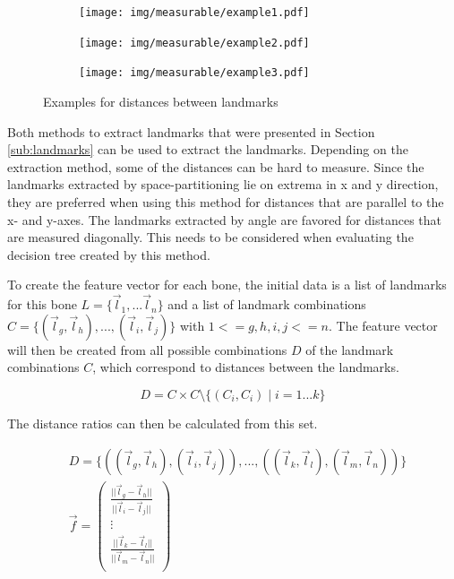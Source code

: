 \documentclass[pdftex,12pt,a4paper]{report}
\begin{document}
\begin{figure}[h]
	\centering
	\begin{subfigure}[b]{0.25\textwidth}
		\centering
		\texttt{[image: img/measurable/example1.pdf]}
	\end{subfigure}
	\begin{subfigure}[b]{0.25\textwidth}
		\centering
		\texttt{[image: img/measurable/example2.pdf]}
	\end{subfigure}
	\begin{subfigure}[b]{0.25\textwidth}
		\centering
		\texttt{[image: img/measurable/example3.pdf]}
	\end{subfigure}
	\caption{Examples for distances between landmarks}
	\label{fig:measurable-distances}
\end{figure}

Both methods to extract landmarks that were presented in Section \ref{sub:landmarks} can be used to extract the landmarks. Depending on the extraction method, some of the distances can be hard to measure. Since the landmarks extracted by space-partitioning lie on extrema in x and y direction, they are preferred when using this method for distances that are parallel to the x- and y-axes. The landmarks extracted by angle are favored for distances that are measured diagonally. This needs to be considered when evaluating the decision tree created by this method.

To create the feature vector for each bone, the initial data is a list of landmarks for this bone $L = \{ \vec{l}_1, ... \vec{l}_n \}$ and a list of landmark combinations $C = \{ (\vec{l}_g, \vec{l}_h), ..., (\vec{l}_i, \vec{l}_j) \}$ with $1 <= g,h,i,j <= n$. The feature vector will then be created from all possible combinations $D$ of the landmark combinations $C$, which correspond to distances between the landmarks.

\begin{equation}
D = C \times C \setminus \{ (C_i, C_i) \mid i = 1 ... k \}
\end{equation}

The distance ratios can then be calculated from this set.

\begin{equation}
\begin{split}
& D = \{ ((\vec{l}_g, \vec{l}_h), (\vec{l}_i, \vec{l}_j)), ..., ((\vec{l}_k, \vec{l}_l), (\vec{l}_m, \vec{l}_n)) \} \\
& \vec{f} = \left( \begin{array}{c}
\frac{||\vec{l}_g - \vec{l}_h||}{||\vec{l}_i - \vec{l}_j||} \\
\vdots \\
\frac{||\vec{l}_k - \vec{l}_l||}{||\vec{l}_m - \vec{l}_n||} \\
\end{array} \right)
\end{split}
\end{equation}
\end{document}
